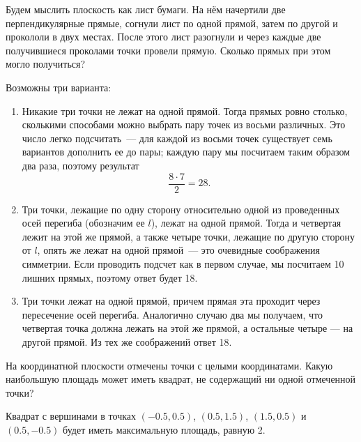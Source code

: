 

\begin{itemize}

\itB Будем мыслить плоскость как лист бумаги. На нём начертили две перпендикулярные прямые, 
согнули лист по одной прямой, затем по другой и прокололи в двух местах. После этого лист 
разогнули и через каждые две получившиеся проколами точки провели прямую. Сколько прямых при 
этом могло получиться?

Возможны три варианта:

\begin{enumerate}
\item Никакие три точки не лежат на одной прямой. Тогда прямых ровно столько, сколькими 
способами можно выбрать пару точек из восьми различных. Это число легко подсчитать~--- 
для каждой из восьми точек существует семь вариантов дополнить ее до пары; каждую пару 
мы посчитаем таким образом два раза, поэтому результат
$$
\frac{8\cdot 7}{2}=28.
$$

\item Три точки, лежащие по одну сторону относительно одной из проведенных осей перегиба 
(обозначим ее $l$), лежат на одной прямой. Тогда и четвертая лежит на этой же прямой, 
а также четыре точки, лежащие по другую сторону от $l$, опять же лежат на одной прямой~--- 
это очевидные соображения симметрии. Если проводить подсчет как в первом случае, мы 
посчитаем 10 лишних прямых, поэтому ответ будет 18.

\item Три точки лежат на одной прямой, причем прямая эта проходит через пересечение осей 
перегиба. Аналогично случаю два мы получаем, что четвертая точка должна лежать на этой же 
прямой, а остальные четыре --- на другой прямой. Из тех же соображений ответ 18.
\end{enumerate}

\itC На координатной плоскости отмечены точки с целыми координатами. Какую 
наибольшую площадь может иметь квадрат, не содержащий ни одной отмеченной точки?

\itr Квадрат с вершинами в точках $(-0.5,0.5)$, $(0.5,1.5)$, $(1.5,0.5)$ и $(0.5,-0.5)$ 
будет иметь максимальную площадь, равную 2. 

\begin{center}\end{center}


\end{itemize}
